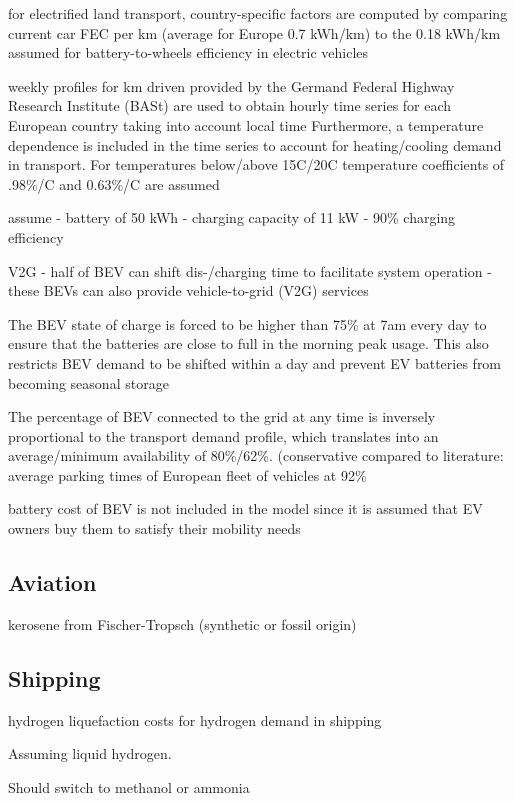 for electrified land transport, country-specific factors are computed by comparing
current car FEC per km (average for Europe 0.7 kWh/km) to the 0.18 kWh/km assumed for
battery-to-wheels efficiency in electric vehicles

weekly profiles for km driven provided by the Germand Federal Highway Research Institute (BASt)
are used to obtain hourly time series for each European country taking into account local time
Furthermore, a temperature dependence is included in the time series to account for heating/cooling
demand in transport. For temperatures below/above 15C/20C temperature coefficients of .98\%/C and 0.63\%/C are assumed \cite{brown2018}

assume
- battery of 50 kWh
- charging capacity of 11 kW
- 90\% charging efficiency

V2G
- half of BEV can shift dis-/charging time to facilitate system operation
- these BEVs can also provide vehicle-to-grid (V2G) services

The BEV state of charge is forced to be higher than 75\% at 7am every day
to ensure that the batteries are close to full in the morning peak usage.
This also restricts BEV demand to be shifted within a day and prevent EV
batteries from becoming seasonal storage

The percentage of BEV connected to the grid at any time is inversely proportional
to the transport demand profile, which translates into an average/minimum availability of 80\%/62\%.
(conservative compared to literature: average parking times of European fleet of vehicles at 92\%

battery cost of BEV is not included in the model since it is assumed that EV owners buy
them to satisfy their mobility needs

\subsection{Aviation}

kerosene from Fischer-Tropsch (synthetic or fossil origin)

\subsection{Shipping}

hydrogen liquefaction costs for hydrogen demand in shipping

Assuming liquid hydrogen.

Should switch to methanol or ammonia

